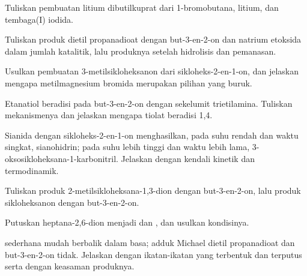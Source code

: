 \begin{exercise}[$\star$]\label{exo:b2:conjugate-additions:3}
Tuliskan pembuatan litium dibutilkuprat dari 1-bromobutana, litium, dan tembaga(I) iodida.
\end{exercise}

\begin{exercise}[$\star$]\label{exo:b2:conjugate-additions:4}
Tuliskan produk dietil propanadioat dengan but-3-en-2-on dan natrium
etoksida dalam jumlah katalitik, lalu produknya setelah hidrolisis dan
pemanasan.
\end{exercise}

\begin{exercise}[$\star\star$]\label{exo:b2:conjugate-additions:5}
Usulkan pembuatan 3-metilsikloheksanon dari sikloheks-2-en-1-on, dan
jelaskan mengapa metilmagnesium bromida merupakan pilihan yang buruk.
\end{exercise}

\begin{exercise}[$\star\star$]\label{exo:b2:conjugate-additions:6}
Etanatiol beradisi pada but-3-en-2-on dengan sekelumit trietilamina.
Tuliskan mekanismenya dan jelaskan mengapa tiolat beradisi 1,4.
\end{exercise}

\begin{exercise}[$\star\star$]\label{exo:b2:conjugate-additions:7}
Sianida dengan sikloheks-2-en-1-on menghasilkan, pada suhu rendah dan waktu
singkat, sianohidrin; pada suhu lebih tinggi dan waktu lebih lama,
3-oksosikloheksana-1-karbonitril. Jelaskan dengan kendali kinetik dan
termodinamik.
\end{exercise}

\begin{exercise}[$\star\star$]\label{exo:b2:conjugate-additions:8}
Tuliskan produk  2-metilsikloheksana-1,3-dion dengan
but-3-en-2-on, lalu produk sikloheksanon dengan but-3-en-2-on.
\end{exercise}

\begin{exercise}[$\star\star$]\label{exo:b2:conjugate-additions:9}
Putuskan heptana-2,6-dion menjadi  dan , dan usulkan kondisinya.
\end{exercise}

\begin{exercise}[$\star\star\star$]\label{exo:b2:conjugate-additions:10}
 sederhana mudah berbalik dalam basa; adduk Michael dietil
propanadioat dan but-3-en-2-on tidak. Jelaskan dengan ikatan-ikatan yang
terbentuk dan terputus serta dengan keasaman produknya.
\end{exercise}

